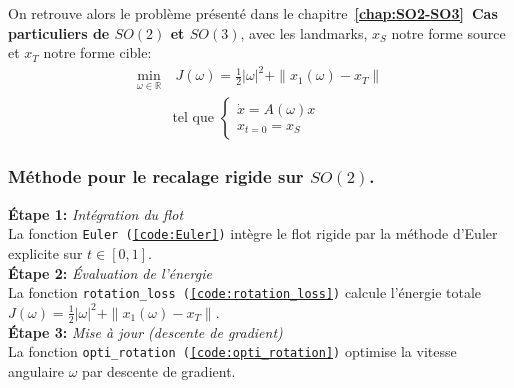 \documentclass[12pt]{report}
\begin{document}
On retrouve alors le problème présenté dans le chapitre~\textbf{\ref{chap:SO2-SO3}~Cas particuliers de \(SO(2)\) et \(SO(3)\)}, avec les landmarks, $x_S$ notre forme source et $x_T$ notre forme cible:
\[
\begin{aligned}
\min_{\omega\in \mathbb{R}}&~J(\omega)=\frac{1}{2}|\omega|^2+\|x_1(\omega)-x_T\|\\
&\text{tel que }\left\{\begin{array}{ll}\dot{x}=A(\omega)x\\x_{t=0}=x_S\end{array}\right.
\end{aligned}
\]

\subsubsection{Méthode pour le recalage rigide sur $SO(2)$.}

\textbf{Étape 1:}\textit{ Intégration du flot}\\
La fonction \texttt{Euler~(\ref{code:Euler})} intègre le flot rigide par la méthode d'Euler explicite sur $t \in [0, 1]$.\\

\textbf{Étape 2:}\textit{ Évaluation de l'énergie}\\
La fonction \texttt{rotation\_loss~(\ref{code:rotation_loss})} calcule l'énergie totale $J(\omega) =\frac{1}{2}{|\omega|}^2+\|x_1(\omega)-x_T\|$.\\

\textbf{Étape 3:}\textit{ Mise à jour (descente de gradient)}\\
La fonction \texttt{opti\_rotation~(\ref{code:opti_rotation})} optimise la vitesse angulaire $\omega$ par descente de gradient.
\end{document}
